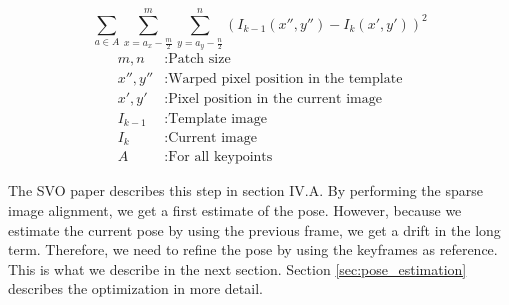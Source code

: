 \documentclass[11pt,a4paper,titlepage,oneside]{report}
\begin{document}
\begin{equation}\label{eq:intensity}
  \sum_{a \in A}\sum_{x=a_x-\frac{m}{2}}^m\sum_{y=a_y-\frac{n}{2}}^n(I_{k-1}(x'',y'')-I_{k}(x',y'))^2
\end{equation}
\begin{align*}
  m,n         &: \text{Patch size}\\
  x'',y''    &: \text{Warped pixel position in the template}\\
  x',y'      &: \text{Pixel position in the current image}\\
  I_{k-1}    &: \text{Template image}\\
  I_{k}      &: \text{Current image}\\
  A          &: \text{For all keypoints}
\end{align*}

The SVO paper \cite{svo} describes this step in section IV.A. By performing the sparse image alignment, we get a first estimate of the pose. However, because we estimate the current pose by using the previous frame, we get a drift in the long term. Therefore, we need to refine the pose by using the keyframes as reference. This is what we describe in the next section. Section \ref{sec:pose_estimation} describes the optimization in more detail.
\end{document}
